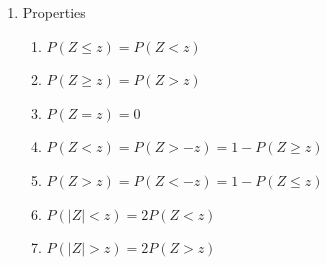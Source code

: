 \documentclass{report}
\begin{document}
\begin{multicols}{2}
\begin{enumerate}
\begin{enumerate}
\begin{enumerate}
\begin{center}
                          \end{center}
                    \item Convert to Standard Normal Distribution
                          \begin{cequation}
                             x \sim N(\mu, \sigma^2),  Z = \text{, } Z \sim N(0, 1)
                          \end{cequation}
                  \end{enumerate}
            \item Properties
                  \begin{enumerate}
                    \item $P(Z \leq z) = P(Z < z)$
                    \item $P(Z \geq z) = P(Z > z)$
                    \item $P(Z = z) = 0$
                    \item $P(Z < z) = P(Z > -z) = 1 - P(Z \geq z)$
                    \item $P(Z > z) = P(Z < -z) = 1 - P(Z \leq z)$
                    \item $P(|Z| < z) = 2P(Z < z)$
                    \item $P(|Z| > z) = 2P(Z > z)$
                  \end{enumerate}
          \end{enumerate}
  \end{enumerate}
\end{multicols}
\end{document}
